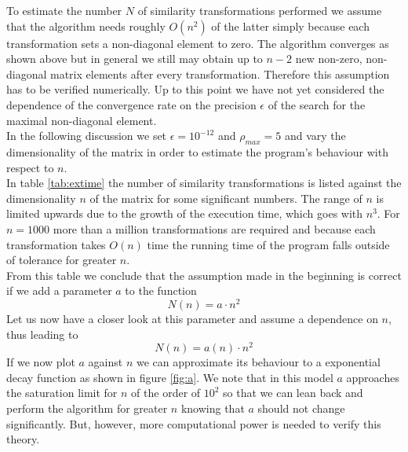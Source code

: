 \documentclass[11pt,a4wide]{article}
\begin{document}
To estimate the number $N$ of similarity transformations performed we assume that the algorithm needs roughly $O(n^2)$ of the latter simply because each transformation sets a non-diagonal element to zero. The algorithm converges as shown above but in general we still may obtain up to $n-2$ new non-zero, non-diagonal matrix elements after every transformation. Therefore this assumption has to be verified numerically. Up to this point we have not yet considered the dependence of the convergence rate on the precision $\epsilon$ of the search for the maximal non-diagonal element.
\\
In the following discussion we set $\epsilon=10^{-12}$ and $\rho_ {max}=5$ and vary the dimensionality of the matrix in order to estimate the program's behaviour with respect to $n$.
\\
In table \ref{tab:extime} the number of similarity transformations is listed against the dimensionality $n$ of the matrix for some significant numbers. The range of $n$ is limited upwards due to the growth of the execution time, which goes with $n^3$. For $n=1000$ more than a million transformations are required and because each transformation takes $O(n)$ time the running time of the program falls outside of tolerance for greater $n$.
\\
From this table we conclude that the assumption made in the beginning is correct if we add a parameter $a$ to the function 
\begin{equation}
N(n)=a\cdot n^2
\label{eq:behofn}
\end{equation}
Let us now have a closer look at this parameter and assume a dependence on $n$, thus leading to
\begin{equation}
N(n)=a(n)\cdot n^2
\label{eq:a(n)}
\end{equation}
If we now plot $a$ against $n$ we can approximate its behaviour to a exponential decay function as shown in figure \ref{fig:a}. We note that in this model $a$ approaches the saturation limit for $n$ of the order of $10^2$ so that we can lean back and perform the algorithm for greater $n$ knowing that $a$ should not change significantly. But, however, more computational power is needed to verify this theory.
\end{document}
